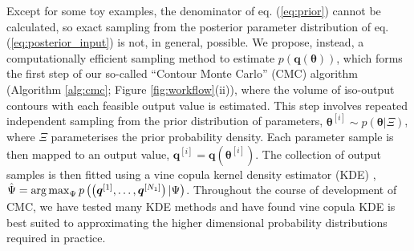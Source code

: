 Except for some toy examples, the denominator of eq. (\ref{eq:prior}) cannot be calculated, so exact sampling from the posterior parameter distribution of eq. (\ref{eq:posterior_input}) is not, in general, possible. We propose, instead, a computationally efficient sampling method to estimate $p(\boldsymbol{q}(\boldsymbol{\theta}))$, which forms the first step of our so-called ``Contour Monte Carlo'' (CMC) algorithm (Algorithm \ref{alg:cmc}; Figure \ref{fig:workflow}(ii)), where the volume of iso-output contours with each feasible output value is estimated. This step involves repeated independent sampling from the prior distribution of parameters, $\boldsymbol{\theta}^{[i]}\sim p(\boldsymbol{\theta}|\Xi)$, where $\Xi$ parameterises the prior probability density.
Each parameter sample is then mapped to an output value, $\boldsymbol{q}^{[i]}=\boldsymbol{q}(\boldsymbol{\theta}^{[i]})$. The collection of output samples is then fitted using a vine copula kernel density estimator (KDE) \cite{nagler2016evading}, $\hat{\Psi} = \operatorname*{arg\,max}_\Psi p\left(\left( \boldsymbol{q}^{[1]}, \dots ,\boldsymbol{q}^{[N_1]} \right)|\Psi\right)$. Throughout the course of development of CMC, we have tested many KDE methods and have found vine copula KDE is best suited to approximating the higher dimensional probability distributions required in practice.


